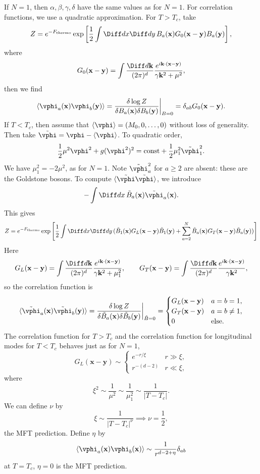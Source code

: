 \documentclass[12pt]{article}
\begin{document}
If $N = 1$, then $\alpha, \beta, \gamma, \delta$ have the same values as for $N = 1$. For correlation functions, we use a quadratic approximation. For $T > T_c$, take
\[
	Z = e^{-F_{\mathrm{thermo}}} \exp \left[\frac 12 \int \Diff d x \Diff d y \, B_a(\mathbf{x}) G_0(\mathbf{x} - \mathbf{y}) B_a(\mathbf{y})\right],
\]
where
\[
G_0(\mathbf{x} - \mathbf{y}) = \int \frac{\Diff d \mathbf{k}}{(2 \pi)^d} \frac{e^{i \mathbf{k}\cdot(\mathbf{x} - \mathbf{y})}}{\gamma \mathbf{k}^2 + \mu^2},
\]
then we find
\[
\langle \vphi_a(\mathbf{x}) \vphi_b(\mathbf{y}) \rangle = \frac{\delta \log Z}{\delta B_a(\mathbf{x}) \delta B_b(\mathbf{y})} \biggr|_{B = 0} = \delta_{ab} G_0(\mathbf{x} - \mathbf{y}).
\]
If $T < T_c$, then assume that $\langle \vphi \rangle = (M_0, 0, \ldots, 0)$ without loss of generality. Then take $\tilde \vphi = \vphi - \langle \vphi \rangle$. To quadratic order,
\[
	\frac 12 \mu^2 \vphi^2 + g(\vphi^2)^2 = \text{const} + \frac 12 \mu_1^2 \tilde \vphi_1^2.
\]
We have $\mu_1^2 = -2 \mu^2$, as for $N = 1$. Note $\tilde \vphi_a^2$ for $a \geq 2$ are absent: these are the Goldstone bosons. To compute $\langle \tilde \vphi \tilde \vphi\rangle$, we introduce
\[
- \int \Diff d x\, \tilde B_a(\mathbf{x}) \tilde \vphi_a(\mathbf{x}).
\]
This gives
\[
	Z = e^{-F_{\mathrm{thermo}}} \exp \left[ \frac 12 \int \Diff d x \Diff d y \, (\tilde B_1(\mathbf{x}) G_L(\mathbf{x} - \mathbf{y}) \tilde B_1(\mathbf{y}) + \sum_{a = 2}^N \tilde B_a(\mathbf{x}) G_T(\mathbf{x} - \mathbf{y}) \tilde B_a(\mathbf{y})) \right]
\]
Here
\[
G_L(\mathbf{x} - \mathbf{y}) = \int \frac{\Diff d \mathbf{k}}{(2 \pi)^d} \frac{e^{ i \mathbf{k} \cdot (\mathbf{x} - \mathbf{y})}}{\gamma \mathbf{k}^2 + \mu_1^2}, \qquad G_T(\mathbf{x} - \mathbf{y}) = \int \frac{\Diff d \mathbf{k}}{(2 \pi)^d} \frac{e^{i\mathbf{k} \cdot (\mathbf{x} - \mathbf{y})}}{\gamma \mathbf{k}^2},
\]
so the correlation function is
\[
\langle \tilde \vphi_a(\mathbf{x}) \tilde \vphi_b(\mathbf{y}) \rangle = \frac{\delta \log Z}{\delta \tilde B_a(\mathbf{x}) \delta \tilde B_b(\mathbf{y})}\biggr|_{\tilde B = 0} =
\begin{cases}
	G_L(\mathbf{x} - \mathbf{y}) & a = b= 1, \\
	G_T(\mathbf{x} - \mathbf{y}) & a = b \neq 1, \\
	0 & \text{else}.
\end{cases}
\]
The correlation function for $T > T_c$ and the correlation function for longitudinal modes for $T < T_c$ behaves just as for $N = 1$,
\[
G_{L}(\mathbf{x} - \mathbf{y}) \sim
\begin{cases}
	e^{-r/\xi} & r \gg \xi,\\
	r^{-(d-2)} & r \ll \xi,
\end{cases}
\]
where
\[
\xi^2 \sim \frac{1}{\mu^2} \sim \frac{1}{\mu_1^2} \sim \frac{1}{|T - T_c|}.
\]
We can define $\nu$ by
\[
\xi \sim \frac{1}{|T - T_c|^\nu} \implies \nu = \frac 12,
\]
the MFT prediction. Define $\eta$ by
\[
\langle \vphi_a(\mathbf{x}) \vphi_b(\mathbf{x}) \rangle \sim \frac{1}{r^{d - 2 + \eta}} \delta_{ab}
\]
at $T = T_c$, $\eta = 0$ is the MFT prediction.
\end{document}
